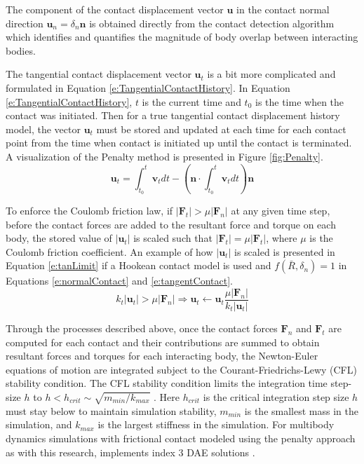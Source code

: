 \documentclass[12pt,onecolumn]{report}
\newcommand{\CHRONO}{{\sffamily{{Chrono}}}}
\begin{document}
The component of the contact displacement vector $\boldsymbol{u}$ in the contact normal direction $\boldsymbol{u}_n = \delta_n \boldsymbol{n}$ is obtained directly from the contact detection algorithm which identifies and quantifies the magnitude of body overlap between interacting bodies. 

The tangential contact displacement vector $\boldsymbol{u}_t$ is a bit more complicated and formulated in Equation \eqref{e:TangentialContactHistory}. In Equation \eqref{e:TangentialContactHistory}, $t$ is the current time and $t_0$ is the time when the contact was initiated. Then for a true tangential contact displacement history model, the vector $\boldsymbol{u}_t$ must be stored and updated at each time for each contact point from the time when contact is initiated up until the contact is terminated. A visualization of the Penalty method is presented in Figure \ref{fig:Penalty}. 
%
\begin{equation}\label{e:TangentialContactHistory}
\boldsymbol{u}_t = \int_{t_0}^{t}\boldsymbol{v}_t dt - \left( \boldsymbol{n}\cdot  \int_{t_0}^{t}\boldsymbol{v}_t dt \right)  \boldsymbol{n}
\end{equation}

To enforce the Coulomb friction law, if $\lvert \boldsymbol{F}_t \rvert > \mu\lvert \boldsymbol{F}_n \rvert$ at any given time step, before the contact forces are added to the resultant force and torque on each body, the stored value of $\lvert\boldsymbol{u}_t\rvert$ is scaled such that $\lvert \boldsymbol{F}_t \rvert = \mu\lvert \boldsymbol{F}_t \rvert$, where $\mu$ is the Coulomb friction coefficient. An example of how $\lvert\boldsymbol{u}_t\rvert$ is scaled is presented in Equation \eqref{e:tanLimit} if a Hookean contact model is used and $ f\left(\bar{R},\delta_n\right) = 1$ in Equations \eqref{e:normalContact} and \eqref{e:tangentContact}.
%
\begin{equation}\label{e:tanLimit}
k_t\lvert \boldsymbol{u}_t \rvert > \mu\lvert \boldsymbol{F}_n \rvert  \Rightarrow \boldsymbol{u}_t \leftarrow \boldsymbol{u}_t \frac{\mu\lvert \boldsymbol{F}_n \rvert}{k_t\lvert \boldsymbol{u}_t \rvert}
\end{equation}

Through the processes described above, once the contact forces $\boldsymbol{F}_n$ and $\boldsymbol{F}_t$ are computed for each contact and their contributions are summed to obtain resultant forces and torques for each interacting body, the Newton-Euler equations of motion are integrated subject to the Courant-Friedrichs-Lewy (CFL) stability condition. The CFL stability condition limits the integration time step-size $h$ to $h<h_{crit} \sim \sqrt{m_{min} / k_{max}}$ \cite{OSullivan&Bray2004}. Here $h_{crit}$ is the critical integration step size $h$ must stay below to maintain simulation stability, $m_{min}$ is the smallest mass in the simulation, and $k_{max}$ is the largest stiffness in the simulation. For multibody dynamics simulations with frictional contact modeled using the penalty approach as with this research, {\CHRONO} implements index 3 DAE solutions \cite{Chrono2016}.
\end{document}
